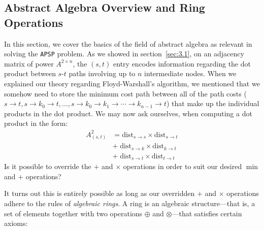 \documentclass[12pt]{article}
\begin{document}
\subsection{Abstract Algebra Overview and Ring Operations}

In this section, we cover the basics of the field of abstract algebra as relevant in solving the \texttt{APSP} problem. As we showed in section~\ref{sec:3.1}, on an adjacency matrix of power $A^{2 \times n}$, the $(s, t)$ entry encodes information regarding the dot product between $s$-$t$ paths involving up to $n$ intermediate nodes. When we explained our theory regarding Floyd-Warshall's algorithm, we mentioned that we somehow need to store the minimum cost path between all of the path costs ($s \to t, s \to k_0 \to t, \ldots, s \to k_0 \to k_1 \to \cdots \to k_{n - 1} \to t$) that make up the individual products in the dot product. We may now ask ourselves, when computing a dot product in the form:
\[
    \begin{split}
        A^2_{(s,t)}
        &= \mathrm{dist}_{s \to s} \times \mathrm{dist}_{s \to t} \\
        &+ \; \mathrm{dist}_{s \to k} \times \mathrm{dist}_{k \to t} \\
        &+ \; \mathrm{dist}_{s \to t} \times \mathrm{dist}_{t \to t}
    \end{split}
\]
Is it possible to override the $+$ and $\times$ operations in order to suit our desired $\min$ and $+$ operations?

It turns out this is entirely possible as long as our overridden $+$ and $\times$ operations adhere to the rules of \emph{algebraic rings}. A ring is an algebraic structure—that is, a set of elements together with two operations $\oplus$ and $\otimes$—that satisfies certain axioms:
\end{document}
